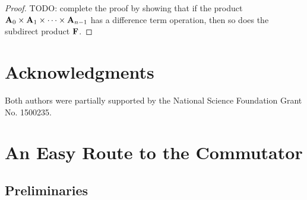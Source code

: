 \begin{proof}
  \medskip

  \noindent TODO: complete the proof by showing that if the product 
  $\mathbf{A}_0 \times \mathbf{A}_1 \times \cdots \times \mathbf{A}_{n-1}$ has a difference term operation,
  then so does the subdirect product $\mathbf{F}$.

  \medskip

\end{proof}




\section*{Acknowledgments}
Both authors were partially supported by the National Science 
Foundation Grant No. 1500235.

\newpage


\appendix



\section{An Easy Route to the Commutator}
\label{sec:interlude:-an-easy}
\subsection{Preliminaries}

